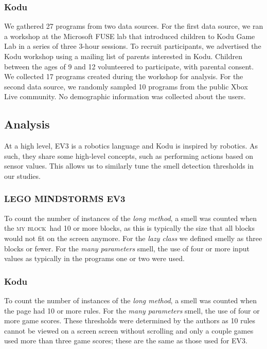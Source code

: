 \documentclass[conference]{IEEEtran}
\newcommand{\ms}{LEGO MINDSTORMS EV3}
\newcommand{\mb}{\textsc{my block}}
\begin{document}
\subsubsection{Kodu}
We gathered 27  programs from two data sources. 
For the first data source, we ran a workshop at the Microsoft FUSE lab that introduced children to Kodu Game Lab in a series of three 3-hour sessions.  To recruit participants, we advertised the Kodu workshop using a mailing list of parents interested in Kodu.  
Children between the ages of 9 and 12 volunteered to participate, with parental consent. We collected 17 programs created during the workshop for analysis. 
For the second data source, we randomly sampled 10 programs from the public Xbox Live community. No demographic information was collected about the users. 



\subsection{Analysis}
At a high level, EV3 is a robotics language and Kodu is inspired by robotics. As such, they share some high-level concepts, such as performing actions based on sensor values. This allows us to similarly tune the smell detection thresholds in our studies.

\subsubsection{\ms}
To count the number of instances of the \emph{long method}, a smell was counted when the \mb~had 10 or more blocks, as this is typically the size that all blocks would not fit on the screen anymore. For the \emph{lazy class} we defined smelly as three blocks or fewer. For the  \emph{many parameters} smell, the use of four or more input values as typically in the programs one or two were used.

\subsubsection{Kodu}
To count the number of instances of the \emph{long method}, a smell was counted when the page had 10 or more rules. For the  \emph{many parameters} smell, the use of four or more game scores. These thresholds were determined by the authors as 10 rules cannot be viewed on a screen screen without scrolling and only a couple games used more than three game scores; these are the same as those used for EV3. 
\end{document}
